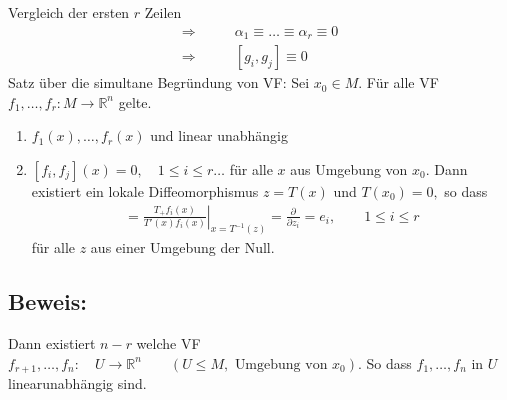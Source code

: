 \documentclass[ngerman]{tudscrreprt}
\begin{document}
Vergleich der ersten $r$ Zeilen 
\begin{align*}
\Rightarrow& \qquad \alpha_1 \equiv \dots \equiv \alpha_r \equiv 0\\
\Rightarrow& \qquad [g_i,g_j] \equiv 0
 \end{align*}
 Satz über die simultane Begründung von VF: Sei $x_0 \in M.$ Für alle VF $f_1,\dots, f_r: M\to \mathbb{R}^{n}$ gelte. 
 \begin{enumerate}
\item $f_1(x),\dots, f_r(x)$ und linear unabhängig
\item $[f_i, f_j](x) = 0, \quad 1\le i\le r \dots$ für alle $x$ aus Umgebung von $x_0$. Dann existiert ein lokale Diffeomorphismus $z= T(x)$ und $T(x_0) = 0,$ so dass \begin{align*} = \left.\frac{T_+ f_i(x)}{T'(x)f_i(x)}\right|_{x=T^{-1}(z)} = \frac{\partial}{\partial z_i} = e_i,\qquad 1\le i \le r \end{align*}
für alle $z$ aus einer Umgebung der Null. 
\end{enumerate}
\subsection*{Beweis:}
Dann existiert $n-r$ welche VF $f_{r+1},\dots, f_n : \quad U\to \mathbb{R}^n \qquad (U\le M, \text{ Umgebung von } x_0)$. So dass $f_1,\dots, f_n$ in $U$ linearunabhängig sind. 
\end{document}
